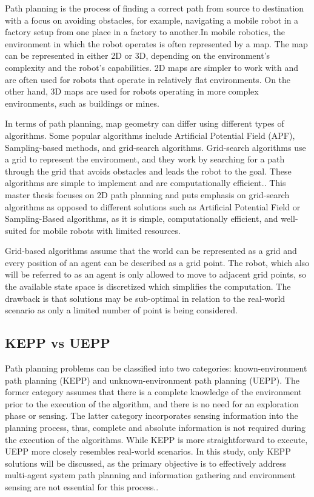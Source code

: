 Path planning is the process of finding a correct path from source to destination with a focus on avoiding obstacles, for example, navigating a mobile robot in a factory setup from one place in a factory to another\cite{path_planning}.In mobile robotics, the environment in which the robot operates is often represented by a map. The map can be represented in either 2D or 3D, depending on the environment's complexity and the robot's capabilities. 2D maps are simpler to work with and are often used for robots that operate in relatively flat environments. On the other hand, 3D maps are used for robots operating in more complex environments, such as buildings or mines.

In terms of path planning, map geometry can differ using different types of algorithms. Some popular algorithms include Artificial Potential Field (APF), Sampling-based methods, and grid-search algorithms. Grid-search algorithms use a grid to represent the environment, and they work by searching for a path through the grid that avoids obstacles and leads the robot to the goal. These algorithms are simple to implement and are computationally efficient.\cite{not_grid_based}. This master thesis focuses on 2D path planning and  puts emphasis on grid-search algorithms as opposed to different solutions such as Artificial Potential Field or Sampling-Based algorithms, as it is simple, computationally efficient, and well-suited for mobile robots with limited resources.

Grid-based algorithms assume that the world can be represented as a grid and every position of an agent can be described as a grid point. The robot, which also will be referred to as an agent is only allowed to move to adjacent grid points, so the available state space is discretized which simplifies the computation. The drawback is that solutions may be sub-optimal in relation to the real-world scenario as only a limited number of point is being considered\cite{SARANYA2014766}.

\subsection{KEPP vs UEPP}
Path planning problems can be classified into two categories: known-environment path planning (KEPP) and unknown-environment path planning (UEPP). The former category assumes that there is a complete knowledge of the environment prior to the execution of the algorithm, and there is no need for an exploration phase or sensing. The latter category incorporates sensing information into the planning process, thus, complete and absolute information is not required during the execution of the algorithms. While KEPP is more straightforward to execute, UEPP more closely resembles real-world scenarios. In this study, only KEPP solutions will be discussed, as the primary objective is to effectively address multi-agent system path planning and information gathering and environment sensing are not essential for this process.\cite{path_planning_protocols}.